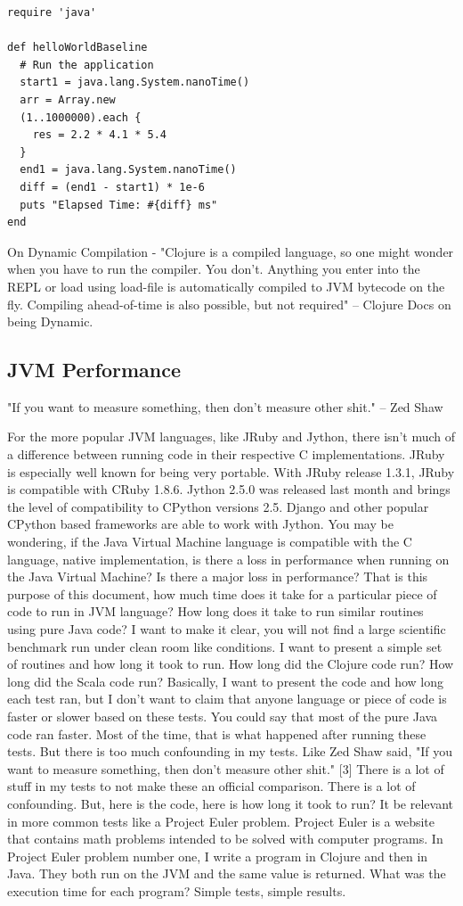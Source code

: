 \begin{verbatim}
require 'java'

def helloWorldBaseline
  # Run the application
  start1 = java.lang.System.nanoTime()
  arr = Array.new
  (1..1000000).each {
    res = 2.2 * 4.1 * 5.4
  }
  end1 = java.lang.System.nanoTime()
  diff = (end1 - start1) * 1e-6  
  puts "Elapsed Time: #{diff} ms"
end
\end{verbatim}

On Dynamic Compilation - "Clojure is a compiled language, so one might wonder when you have to run the compiler. You don't. Anything you enter into the REPL or load using load-file is automatically compiled to JVM bytecode on the fly. Compiling ahead-of-time is also possible, but not required" -- Clojure Docs on being Dynamic.

\subsection{JVM Performance}

"If you want to measure something, then don’t measure other shit." -- Zed Shaw

For the more popular JVM languages, like JRuby and Jython, there isn't much of a difference between running code in their respective C implementations. JRuby is especially well known for being very portable. With JRuby release 1.3.1, JRuby is compatible with CRuby 1.8.6. Jython 2.5.0 was released last month and brings the level of compatibility to CPython versions 2.5. Django and other popular CPython based frameworks are able to work with Jython. You may be wondering, if the Java Virtual Machine language is compatible with the C language, native implementation, is there a loss in performance when running on the Java Virtual Machine? Is there a major loss in performance? That is this purpose of this document, how much time does it take for a particular piece of code to run in JVM language? How long does it take to run similar routines using pure Java code? I want to make it clear, you will not find a large scientific benchmark run under clean room like conditions. I want to present a simple set of routines and how long it took to run. How long did the Clojure code run? How long did the Scala code run? Basically, I want to present the code and how long each test ran, but I don't want to claim that anyone language or piece of code is faster or slower based on these tests. You could say that most of the pure Java code ran faster. Most of the time, that is what happened after running these tests. But there is too much confounding in my tests. Like Zed Shaw said, "If you want to measure something, then don't measure other shit." [3] There is a lot of stuff in my tests to not make these an official comparison. There is a lot of confounding. But, here is the code, here is how long it took to run? It be relevant in more common tests like a Project Euler problem. Project Euler is a website that contains math problems intended to be solved with computer programs. In Project Euler problem number one, I write a program in Clojure and then in Java. They both run on the JVM and the same value is returned. What was the execution time for each program? Simple tests, simple results.

